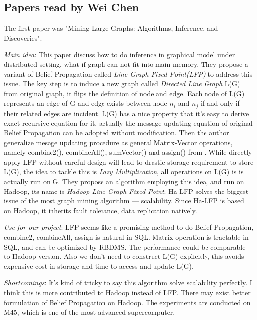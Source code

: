 \subsection{Papers read by Wei Chen}
The first paper was "Mining Large Graphs: Algorithms, Inference, and Discoveries".
\cite{DBLP:conf/icde/KangCF11}
\begin{itemize*}
\item {\em Main idea}: 
This paper discuss how to do inference in graphical model under distributed setting, what if graph can not fit into main memory. They propose a variant of Belief Propagation called \emph{Line Graph Fixed Point(LFP)} to address this issue. The key step is to induce a new graph called \emph{Directed Line Graph} L(G) from original graph, it flips the definition of node and edge. Each node of L(G) represents an edge of G and edge exists between node $n_{i}$ and $n_j$ if and only if their related edges are incident. L(G) has a nice property that it's easy to derive exact recursive equation for it, actually the message updating equation of original Belief Propagation \cite{bp} can be adopted without modification. Then the author generalize mesage updating procedure as general Matrix-Vector operations, namely combine2(), combineAll(), sumVector() and assign() from \cite{Kang09}. While directly apply LFP without careful design will lead to drastic storage requirement to store L(G), the idea to tackle this is \emph{Lazy Multiplication}, all operations on L(G) is is actually run on G. They propose an algorithm employing this idea, and run on Hadoop, its name is \emph{Hadoop Line Graph Fixed Point}. Ha-LFP solves the biggest issue of the most graph mining algorithm --- scalability. Since Ha-LFP is based on Hadoop, it inherits fault tolerance, data replication natively.
\item {\em Use for our project}:
      LFP seems like a promising method to do Belief Propagation, combine2, combineAll, assign is natural in SQL. Matrix operation is tractable in SQL, and can be optimized by RBDMS. The performance could be comparable to Hadoop version. Also we don't need to construct L(G) explicitly, this avoids expensive cost in storage and time to access and update L(G).
\item {\em Shortcomings}:
      It's kind of tricky to say this algorithm solve scalability perfectly. I think this is more contributed to Hadoop instead of LFP. There may exist better formulation of Belief Propagation on Hadoop. The experiments are conducted on M45, which is one of the most advanced supercomputer.
\end{itemize*}


